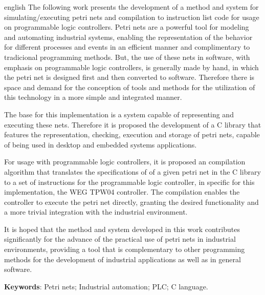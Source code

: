 \begin{resumo}[Abstract]
\begin{otherlanguage*}{english}
The following work presents the development of a method and system for simulating/executing petri nets and compilation to instruction list code for usage on programmable logic controllers. Petri nets are a powerful tool for modeling and automating industrial systems, enabling the representation of the behavior for different processes and events in an efficient manner and complimentary to tradicional programming methods. But, the use of these nets in software, with emphasis on programmable logic controllers, is generally made by hand, in which the petri net is designed first and then converted to software. Therefore there is space and demand for the conception of tools and methods for the utilization of this technology in a more simple and integrated manner. 

The base for this implementation is a system capable of representing and executing these nets. Therefore it is proposed the development of a C library that features the representation, checking, execution and storage of petri nets, capable of being used in desktop and embedded systems applications. 

For usage with programmable logic controllers, it is proposed an compilation algorithm that translates the specifications of of a given petri net in the C library to a set of instructions for the programmable logic controller, in specific for this implementation, the WEG TPW04 controller. The compilation enables the controller to execute the petri net directly, granting the desired functionality and a more trivial integration with the industrial environment.

It is hoped that the method and system developed in this work contributes significantly for the advance of the practical use of petri nets in industrial environments, providing a tool that is complementary to other programming methods for the development of industrial applications as well as in general software.

\textbf{Keywords}: Petri nets; Industrial automation; PLC; C language.
\end{otherlanguage*}
\end{resumo}